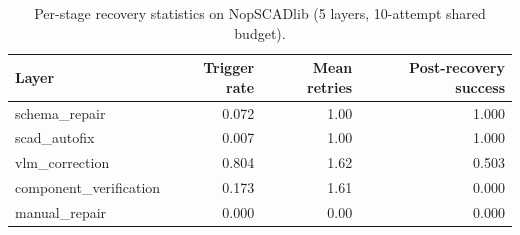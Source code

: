 \begin{table}[t]
\centering
\caption{Per-stage recovery statistics on NopSCADlib (5 layers, 10-attempt shared budget).}
\label{tab:recovery_stats}
\begin{tabular}{lrrr}
\toprule
Layer & Trigger rate & Mean retries & Post-recovery success \\
\midrule
schema\_repair & 0.072 & 1.00 & 1.000 \\
scad\_autofix & 0.007 & 1.00 & 1.000 \\
vlm\_correction & 0.804 & 1.62 & 0.503 \\
component\_verification & 0.173 & 1.61 & 0.000 \\
manual\_repair & 0.000 & 0.00 & 0.000 \\
\bottomrule
\end{tabular}
\end{table}
